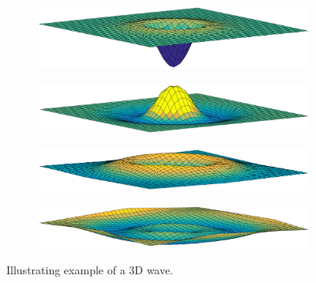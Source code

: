 \documentclass[12pt]{article}
\begin{document}
\begin{figure}[!h]
\centering
\begin{subfigure}[b]{0.49\textwidth}
\includegraphics[width=\textwidth]{fig/3dv2_1.eps}
\label{fig1}
\end{subfigure}
\begin{subfigure}[b]{0.49\textwidth}
\includegraphics[width=\textwidth]{fig/3dv2_2.eps}
\label{fig1}
\end{subfigure}
\begin{subfigure}[b]{0.49\textwidth}
\includegraphics[width=\textwidth]{fig/3dv2_3.eps}
\label{fig1}
\end{subfigure}
\begin{subfigure}[b]{0.49\textwidth}
\includegraphics[width=\textwidth]{fig/3dv2_5.eps}
\label{fig1}
\end{subfigure}
\caption{Illustrating example of a 3D wave.}
\label{fig:3dWave}
\end{figure}

\clearpage

%
%
\end{document}
